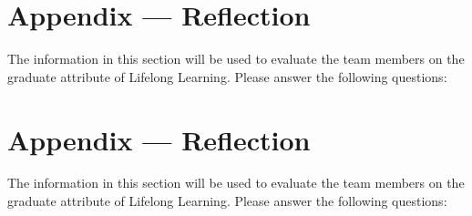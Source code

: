 \documentclass[12pt, titlepage]{article}
\begin{document}
\newpage{}
\section*{Appendix --- Reflection}

The information in this section will be used to evaluate the team members on the
graduate attribute of Lifelong Learning.  Please answer the following questions:

\newpage{}
\section*{Appendix --- Reflection}


The information in this section will be used to evaluate the team members on the
graduate attribute of Lifelong Learning.  Please answer the following questions:
\end{document}
